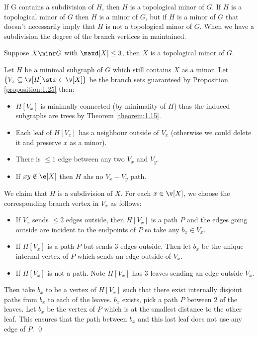 If G contains a subdivision of $H$, then $H$ is a topological minor of $G$. If $H$ is a topological minor of $G$ then $H$ is a minor of $G$, but if $H$ is a minor of $G$ that doesn't necessarily imply that $H$ is not a topological minor of $G$. When we have a subdivision the degree of the branch vertices in maintained.
\begin{customproposition}{1.27}
    \label{proposition:1.27}
    Suppose $X \minr G$ with $\maxd[X] \leq 3$, then $X$ is a topological minor of $G$.
\end{customproposition}
\begin{prf}
    Let $H$ be a minimal subgraph of $G$ which still contains $X$ as a minor. Let $\{V_x \subseteq \v[H] \st x \in \v[X]\}$ be the branch sets guaranteed by Proposition \ref{proposition:1.25} then:
    \begin{itemize}
        \item $H[V_x]$ is minimally connected (by minimality of $H$) thus the induced subgraphs are trees by Theorem \ref{theorem:1.15}.
        \item Each leaf of $H[V_x]$ has a neighbour outside of $V_x$ (otherwise we could delete it and preserve $x$ as a minor).
        \item There is $\leq 1$ edge between any two $V_x$ and $V_y$.
        \item If $xy \notin \e[X]$ then $H$ ahs no $V_x - V_y$ path.
    \end{itemize}
    We claim that $H$ is a subdivision of $X$. For each $x \in \v[X]$, we choose the corresponding branch vertex in $V_x$ as follows:
    \begin{itemize}
        \item If $V_x$ sends $\leq 2$ edges outside, then $H[V_x]$ is a path $P$ and the edges going outside are incident to the endpoints of $P$ so take any $b_x \in V_x$.
        \item If $H[V_x]$ is a path $P$ but sends $3$ edges outside. Then let $b_x$ be the unique internal vertex of $P$ which sends an edge outside of $V_x$.
        \item If $H[V_x]$ is not a path. Note $H[V_x]$ has $3$ leaves sending an edge outside $V_x.$
    \end{itemize}
    Then take $b_x$ to be a vertex of $H[V_x]$ such that there exist internally disjoint paths from $b_x$ to each of the leaves. $b_x$ exists, pick a path $P$ between $2$ of the leaves. Let $b_x$ be the vertex of $P$ which is at the smallest distance to the other leaf. This ensures that the path between $b_x$ and this last leaf does not use any edge of $P$. \qed
\end{prf}